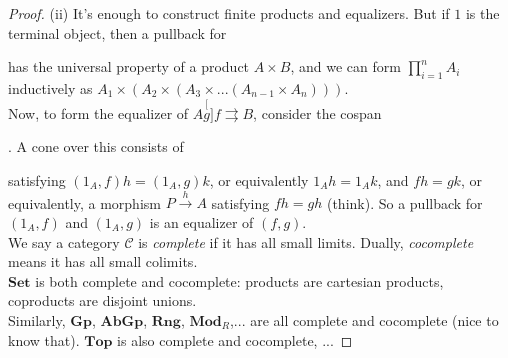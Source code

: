 \documentclass[a4paper]{article}
\begin{document}
\begin{thm}
\begin{proof}
        (ii) It's enough to construct finite products and equalizers. But if $1$ is the terminal object, then a pullback for 
        has the universal property of a product $A \times B$, and we can form $\prod_{i=1}^n A_i$ inductively as $A_1 \times (A_2 \times (A_3 \times ... (A_{n-1} \times A_n)))$.\\
        Now, to form the equalizer of $A \stackrel[g]{f}{\rightrightarrows} B$, consider the cospan
        . A cone over this consists of 
        satisfying $(1_A,f) h = (1_A,g) k$, or equivalently $1_A h = 1_A k$, and $fh = gk$, or equivalently, a morphism $P \xrightarrow{h} A$ satisfying $fh = gh$ (think). So a pullback for $(1_A,f)$ and $(1_A,g)$ is an equalizer of $(f,g)$.\\
        We say a category $\mathcal{C}$ is \emph{complete} if it has all small limits. Dually, \emph{cocomplete} means it has all small colimits.\\
        $\mathbf{Set}$ is both complete and cocomplete: products are cartesian products, coproducts are disjoint unions.\\
        Similarly, $\mathbf{Gp}$, $\mathbf{AbGp}$, $\mathbf{Rng}$, $\mathbf{Mod}_R$,... are all complete and cocomplete (nice to know that). $\mathbf{Top}$ is also complete and cocomplete, ...
    \end{proof}
\end{thm}
\end{document}
